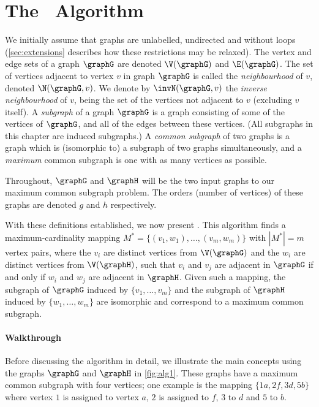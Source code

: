 \section{The \McSplit\ Algorithm \label{sec:mcsplit}}

We initially assume that graphs are unlabelled, undirected and without loops
(\cref{sec:extensions} describes how these restrictions may be relaxed).  The
vertex and edge sets of a graph $\graphG$ are denoted $\V(\graphG)$ and
$\E(\graphG)$.  The set of vertices adjacent to vertex $v$ in graph $\graphG$
is called the \emph{neighbourhood} of $v$, denoted $\N(\graphG, v)$. We denote
by $\invN(\graphG, v)$ the \emph{inverse neighbourhood} of $v$, being the set
of the vertices not adjacent to $v$ (excluding $v$ itself). A \emph{subgraph}
of a graph $\graphG$ is a graph consisting of some of the vertices of
$\graphG$, and all of the edges between these vertices. (All subgraphs in this
chapter are induced subgraphs.) A \emph{common subgraph} of two graphs is a graph
which is (isomorphic to) a subgraph of two graphs simultaneously, and a
\emph{maximum} common subgraph is one with as many vertices as possible.

Throughout, $\graphG$ and $\graphH$ will be the two input graphs to our maximum
common subgraph problem.  The orders (number of vertices) of these graphs are
denoted $g$ and $h$ respectively.

With these definitions established, we now present \McSplit. This algorithm
finds a maximum-cardinality mapping $M^* = \{(v_1, w_1), \dots, (v_{m},
w_{m})\}$ with $|M^*| = m$ vertex pairs, where the $v_i$ are distinct vertices
from $\V(\graphG)$ and the $w_i$ are distinct vertices from $\V(\graphH)$, such
that $v_i$ and $v_j$ are adjacent in $\graphG$ if and only if $w_i$ and $w_j$
are adjacent in $\graphH$.  Given such a mapping, the subgraph of $\graphG$
induced by $\{v_1, \dots, v_{m}\}$ and the subgraph of $\graphH$ induced by
$\{w_1, \dots, w_{m}\}$ are isomorphic and correspond to a maximum common subgraph.

\paragraph{Walkthrough} Before discussing the algorithm in detail, we illustrate
the main concepts using the graphs $\graphG$ and $\graphH$ in
\cref{fig:alg1}.  These graphs have a maximum common subgraph with four
vertices; one example is the mapping $\{1a, 2f, 3d, 5b\}$ where vertex $1$ is
assigned to vertex $a$, $2$ is assigned to $f$, $3$ to $d$ and $5$ to $b$.

